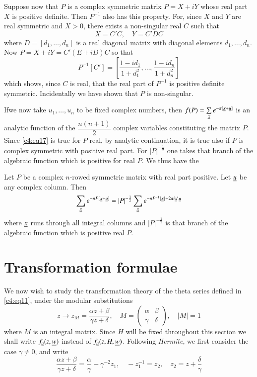 Suppose now that $P$ is a complex symmetric matrix $P=X+iY$ whose real
part $X$ is positive definite. Then $P^{-1}$ also has this
property. For, since $X$ and $Y$ are real symmetric and $X>0$, there
exists a non-singular real $C$ such that
$$
X=C'C,\quad Y=C'DC
$$
where $D=[d_{1},\ldots,d_{n}]$ is a real diagonal matrix with diagonal
elements $d_{1},\ldots,d_{n}$. Now $P=X+iY=C'(E+iD)C$ so that
\begin{equation*}
P^{-1}[C']=\left[\frac{1-id_{1}}{1+d_{1}^{2}},\ldots,\frac{1-id_{n}}{1+d^{2}_{n}}\right]\tag{18}\label{c4:eq18} 
\end{equation*}
which shows, since $C$ is real, that the real part of $P^{-1}$ is
positive definite symmetric. Incidentally we have shown that $P$ is
non-singular. 

If\pageoriginale we now take $u_{1},\ldots,u_{n}$ to be fixed complex
numbers, then $f(P)=\sum\limits_{\underline{x}}e^{-\pi[\underline{x}+\underline{u}]}$ is an
analytic function of the $\dfrac{n(n+1)}{2}$ complex variables
constituting the matrix $P$. Since \eqref{c4:eq17} is true for $P$ real, by
analytic continuation, it is true also if $P$ is complex symmetric
with positive real part. For $|P|^{-\frac{1}{2}}$ one takes that
branch of the algebraic function which is positive for real $P$. We
thus have the

\setcounter{lem}{0}
\begin{lem}\label{chap4:lem1}
Let $P$ be a complex $n$-rowed symmetric matrix with real part
positive. Let $\underline{u}$ be any complex column. Then
$$
\sum_{\underline{x}}e^{-\pi
  P[\underline{x}+\underline{u}]}=|P|^{-\frac{1}{2}}\sum_{\underline{x}}e^{-\pi
  P^{-1}[\underline{x}]+2\pi i\underline{x}'\underline{u}} 
$$
where $\underline{x}$ runs through all integral columns and
$|P|^{-\frac{1}{2}}$ is that branch of the algebraic function which is
positive real $P$.
\end{lem}

\section{Transformation formulae}\label{chap4:sec3}

We now wish to study the transformation theory of the theta series
defined in \eqref{c4:eq11}, under the modular substitutions
\begin{equation*}
z\to z_{M}=\frac{\alpha z+\beta}{\gamma z+\delta},\quad M=
\begin{pmatrix}
\alpha & \beta\\
\gamma & \delta
\end{pmatrix},\quad |M|=1\tag{19}\label{c4:eq19}
\end{equation*}
where $M$ is an integral matrix. Since $H$ will be fixed throughout
this section we shall write $f_{\underline{a}}(z,\underline{w})$ instead of
$f_{\underline{a}}(z,H,\underline{w})$. Following {\em Hermite}, we first consider
the case $\gamma\neq 0$, and write
\begin{equation*}
\frac{\alpha z+\beta}{\gamma
  z+\delta}=\frac{\alpha}{\gamma}+\gamma^{-2}z_{1},\quad
-z^{-1}_{1}=z_{2},\quad
z_{2}=z+\frac{\delta}{\gamma}\tag{20}\label{c4:eq20} 
\end{equation*}

